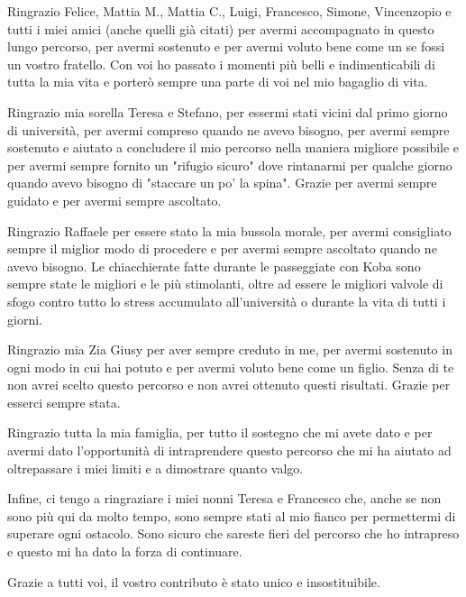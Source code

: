Ringrazio Felice, Mattia M., Mattia C., Luigi, Francesco, Simone, Vincenzopio e tutti i miei amici (anche quelli già citati) per avermi accompagnato in questo lungo percorso, per avermi sostenuto e per avermi voluto bene come un se fossi un vostro fratello. Con voi ho passato i momenti più belli e indimenticabili di tutta la mia vita e porterò sempre una parte di voi nel mio bagaglio di vita.

Ringrazio mia sorella Teresa e Stefano, per essermi stati vicini dal primo giorno di università, per avermi compreso quando ne avevo bisogno, per avermi sempre sostenuto e aiutato a concludere il mio percorso nella maniera migliore possibile e per avermi sempre fornito un "rifugio sicuro" dove rintanarmi per qualche giorno quando avevo bisogno di "staccare un po' la spina". Grazie per avermi sempre guidato e per avermi sempre ascoltato.

Ringrazio Raffaele per essere stato la mia bussola morale, per avermi consigliato sempre il miglior modo di procedere e per avermi sempre ascoltato quando ne avevo bisogno. Le chiacchierate fatte durante le passeggiate con Koba sono sempre state le migliori e le più stimolanti, oltre ad essere le migliori valvole di sfogo contro tutto lo stress accumulato all'università o durante la vita di tutti i giorni.

Ringrazio mia Zia Giusy per aver sempre creduto in me, per avermi sostenuto in ogni modo in cui hai potuto e per avermi voluto bene come un figlio. Senza di te non avrei scelto questo percorso e non avrei ottenuto questi risultati. Grazie per esserci sempre stata.

Ringrazio tutta la mia famiglia, per tutto il sostegno che mi avete dato e per avermi dato l'opportunità di intraprendere questo percorso che mi ha aiutato ad oltrepassare i miei limiti e a dimostrare quanto valgo.

Infine, ci tengo a ringraziare i miei nonni Teresa e Francesco che, anche se non sono più qui da molto tempo, sono sempre stati al mio fianco per permettermi di superare ogni ostacolo. Sono sicuro che sareste fieri del percorso che ho intrapreso e questo mi ha dato la forza di continuare.

Grazie a tutti voi, il vostro contributo è stato unico e insostituibile.